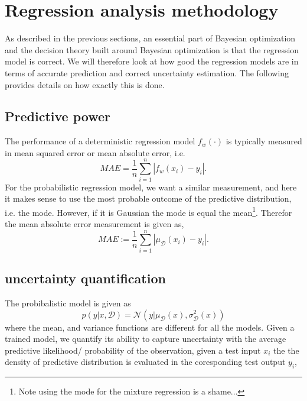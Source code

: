  
 
 

 \section{Regression analysis methodology}
 As described in the previous sections, an essential part of Bayesian optimization and the decision
 theory built around Bayesian optimization is that the regression model is correct. We will therefore
 look at how good the regression models are in terms of accurate prediction and 
 correct uncertainty estimation. The following provides details on how exactly this is done. 
 

 \subsection{Predictive power}
 The performance of a deterministic regression model $f_w(\cdot)$ is typically measured in mean squared error or 
 mean absolute error, i.e. 
 $$MAE = \frac{1}{n}\sum_{i=1}^n |f_{w}(x_i) - y_i|.$$
 For the probabilistic regression model, we want a similar measurement, and here it makes sense to 
 use the most probable outcome of the predictive distribution, i.e. the mode. However, if it is Gaussian
 the mode is equal the mean\footnote{Note using the mode for the mixture regression is a shame...}. Therefor the mean absolute error measurement is given as, 
 $$MAE :=\frac{1}{n}\sum_{i=1}^n |\mu_{\mathcal{D}}(x_i) - y_i|.$$
 \subsection{uncertainty quantification}
 The probibalistic model is given as 
 $$p(y|x,\mathcal{D}) = \mathcal{N}(y|\mu_{\mathcal{D}}(x), \sigma_{\mathcal{D}}^2(x))$$
 where the mean, and variance functions are different for all the models. 
 Given a trained model, we quantify its ability to capture uncertainty with the average
 predictive likelihood/ probability of the observation, given a test input $x_i$ the
 the density of predictive distribution is evaluated in the coresponding test output $y_i$,

